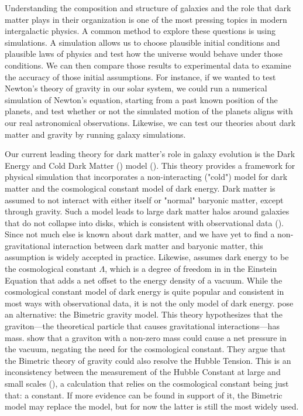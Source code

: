 
Understanding the composition and structure of galaxies and the role that dark matter plays in their organization is one of the most pressing topics in modern intergalactic physics. A common method to explore these questions is using simulations. A simulation allows us to choose plausible initial conditions and plausible laws of physics and test how the universe would behave under those conditions. We can then compare those results to experimental data to examine the accuracy of those initial assumptions. For instance, if we wanted to test Newton's theory of gravity in our solar system, we could run a numerical simulation of Newton's equation, starting from a past known position of the planets, and test whether or not the simulated motion of the planets aligns with our real astronomical observations. Likewise, we can test our theories about dark matter and gravity by running galaxy simulations.


Our current leading theory for dark matter's role in galaxy evolution is the Dark Energy and Cold Dark Matter (\lcdm) model (\cite{salesBaryonicSolutionsChallenges2022}). This theory provides a framework for physical simulation that incorporates a non-interacting ("cold") model for dark matter and the cosmological constant model of dark energy. Dark matter is assumed to not interact with either itself or "normal" baryonic matter, except through gravity. Such a model leads to large dark matter halos around galaxies that do not collapse into disks, which is consistent with observational data (\cite{feldmannFIREboxSimulatingGalaxies2022}). Since not much else is known about dark matter, and we have yet to find a non-gravitational interaction between dark matter and baryonic matter, this assumption is widely accepted in practice. Likewise, \cite{feldmannFIREboxSimulatingGalaxies2022} assumes dark energy to be the cosmological constant $\Lambda$, which is a degree of freedom in in the Einstein Equation that adds a net offset to the energy density of a vacuum. While the cosmological constant model of dark energy is quite popular and consistent in most ways with observational data, it is not the only model of dark energy. \cite{bassiCosmologicalEvolutionBimetric2023} pose an alternative: the Bimetric gravity model. This theory hypothesizes that the graviton---the theoretical particle that causes gravitational interactions---has mass. \cite{bassiCosmologicalEvolutionBimetric2023} show that a graviton with a non-zero mass could cause a net pressure in the vacuum, negating the need for the cosmological constant. They argue that the Bimetric theory of gravity could also resolve the Hubble Tension. This is an inconsistency between the measurement of the Hubble Constant at large and small scales (\cite{senCosmologicalObservationsAllow2022}), a calculation that relies on the cosmological constant being just that: a constant. If more evidence can be found in support of it, the Bimetric model may replace the \lcdm\space model, but for now the latter is still the most widely used.


